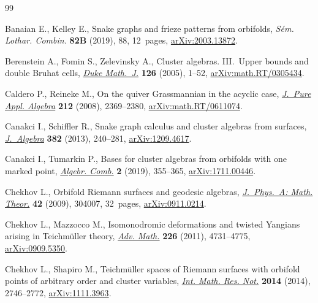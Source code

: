 \documentclass[pdftex]{sigma}%
\numberwithin{equation}{section}
\begin{document}
\begin{thebibliography}{99}
\footnotesize\itemsep=0pt

Banaian E., Kelley E., Snake graphs and frieze patterns from orbifolds,
 \textit{S\'em. Lothar. Combin.} \textbf{82B} (2019), 88, 12~pages,
 \href{https://arxiv.org/abs/2003.13872}{arXiv:2003.13872}.

Berenstein A., Fomin S., Zelevinsky A., Cluster algebras. {III}.~{U}pper bounds
 and double {B}ruhat cells, \href{https://doi.org/10.1215/S0012-7094-04-12611-9}{\textit{Duke Math.~J.}} \textbf{126} (2005), 1--52,
 \href{https://arxiv.org/abs/math.RT/0305434}{arXiv:math.RT/0305434}.

Caldero P., Reineke M., On the quiver {G}rassmannian in the acyclic case,
 \href{https://doi.org/10.1016/j.jpaa.2008.03.025}{\textit{J.~Pure Appl. Algebra}} \textbf{212} (2008), 2369--2380,
 \href{https://arxiv.org/abs/math.RT/0611074}{arXiv:math.RT/0611074}.

Canakci I., Schiffler R., Snake graph calculus and cluster algebras from
 surfaces, \href{https://doi.org/10.1016/j.jalgebra.2013.02.018}{\textit{J.~Algebra}} \textbf{382} (2013), 240--281,
 \href{https://arxiv.org/abs/1209.4617}{arXiv:1209.4617}.

Canakci I., Tumarkin P., Bases for cluster algebras from orbifolds with one
 marked point, \href{https://doi.org/10.5802/alco.48}{\textit{Algebr. Comb.}} \textbf{2} (2019), 355--365,
 \href{https://arxiv.org/abs/1711.00446}{arXiv:1711.00446}.

Chekhov L., Orbifold {R}iemann surfaces and geodesic algebras,
 \href{https://doi.org/10.1088/1751-8113/42/30/304007}{\textit{J.~Phys.~A: Math. Theor.}} \textbf{42} (2009), 304007, 32~pages,
 \href{https://arxiv.org/abs/0911.0214}{arXiv:0911.0214}.

Chekhov L., Mazzocco M., Isomonodromic deformations and twisted {Y}angians
 arising in {T}eichm\"uller theory, \href{https://doi.org/10.1016/j.aim.2010.12.017}{\textit{Adv. Math.}} \textbf{226} (2011),
 4731--4775, \href{https://arxiv.org/abs/0909.5350}{arXiv:0909.5350}.

Chekhov L., Shapiro M., Teichm\"uller spaces of {R}iemann surfaces with
 orbifold points of arbitrary order and cluster variables, \href{https://doi.org/10.1093/imrn/rnt016}{\textit{Int. Math.
 Res. Not.}} \textbf{2014} (2014), 2746--2772, \href{https://arxiv.org/abs/1111.3963}{arXiv:1111.3963}.


\end{thebibliography}
\end{document}
